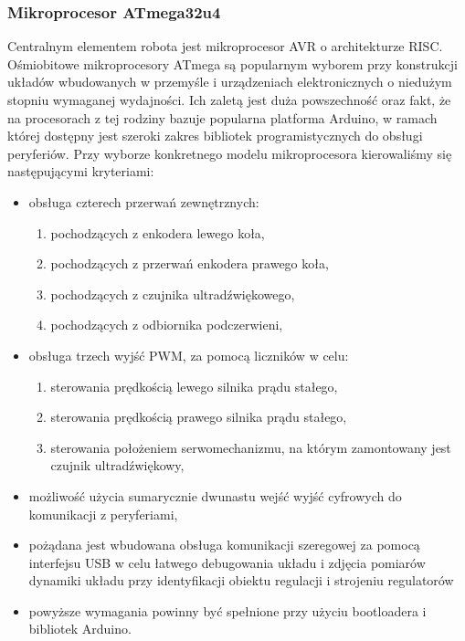 \documentclass[11pt]{article}
\begin{document}
\subsubsection{Mikroprocesor ATmega32u4}
Centralnym elementem robota jest mikroprocesor AVR o architekturze RISC. Ośmiobitowe mikroprocesory ATmega są popularnym wyborem przy konstrukcji układów wbudowanych w przemyśle i urządzeniach elektronicznych o niedużym stopniu wymaganej wydajności.
Ich zaletą jest duża powszechność oraz fakt, że na procesorach z tej rodziny bazuje popularna platforma Arduino, w ramach której dostępny jest szeroki zakres bibliotek programistycznych do obsługi peryferiów. Przy wyborze konkretnego modelu mikroprocesora kierowaliśmy się następującymi kryteriami:
\begin{itemize}
	\item obsługa czterech przerwań zewnętrznych:
		\begin{enumerate}
			\item pochodzących z enkodera lewego koła,
			\item pochodzących z przerwań enkodera prawego koła,
			\item pochodzących z czujnika ultradźwiękowego,
			\item pochodzących z odbiornika podczerwieni, 
		\end{enumerate}
	\item obsługa trzech wyjść PWM, za pomocą liczników w celu:
		\begin{enumerate}
			\item sterowania prędkością lewego silnika prądu stałego,
			\item sterowania prędkością prawego silnika prądu stałego,
			\item sterowania położeniem serwomechanizmu, na którym zamontowany jest czujnik ultradźwiękowy,
		\end{enumerate}
	\item możliwość użycia sumarycznie dwunastu wejść wyjść cyfrowych do komunikacji z peryferiami,
	\item pożądana jest wbudowana obsługa komunikacji szeregowej za pomocą interfejsu USB w celu łatwego debugowania układu i zdjęcia pomiarów dynamiki układu przy identyfikacji obiektu regulacji i strojeniu regulatorów
	\item powyższe wymagania powinny być spełnione przy użyciu bootloadera i bibliotek Arduino.
\end{itemize}
\end{document}
